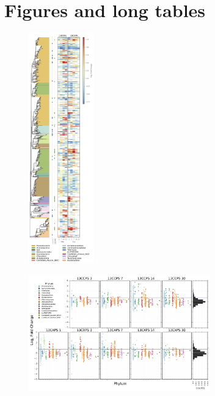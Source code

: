 \section{Figures and long tables}
\newpage

\begin{figure}[H]
	\begin{center}
	\centerline{\includegraphics[width=0.25\textwidth]{figures/bacteria_tree/bacteria_tree.png}}
	\caption{\protect}
        \end{center}
	\label{fig:trees}
\end{figure}

\begin{figure}[H]
	\begin{center}
	\centerline{\includegraphics[width=0.7\textwidth]{figures/l2fc_fig1/l2fc_fig.pdf}}
	\caption{\protect}
        \end{center}
	\label{fig:l2fc}
\end{figure}


